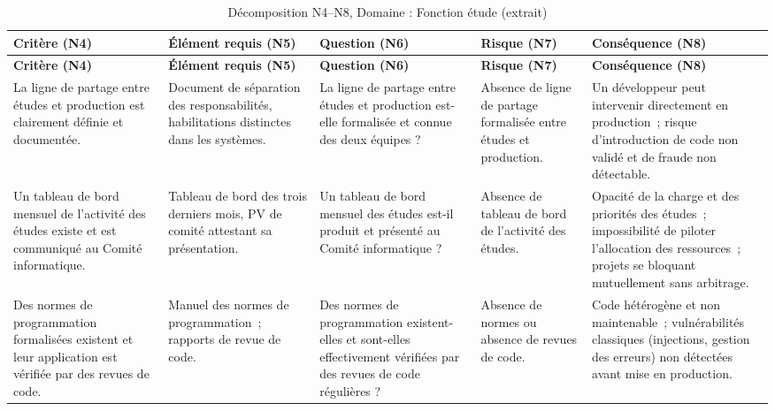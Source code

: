 \begin{longtable}{>{\raggedright\arraybackslash}p{3.2cm}
                  >{\raggedright\arraybackslash}p{3cm}
                  >{\raggedright\arraybackslash}p{2.8cm}
                  >{\raggedright\arraybackslash}p{2.6cm}
                  >{\raggedright\arraybackslash}p{2.8cm}}

\caption{Décomposition N4--N8, Domaine : Fonction étude (extrait)} \\

\toprule
\textbf{Critère (N4)} & \textbf{Élément requis (N5)} & \textbf{Question (N6)} & \textbf{Risque (N7)} & \textbf{Conséquence (N8)} \\
\midrule
\endfirsthead

\toprule
\textbf{Critère (N4)} & \textbf{Élément requis (N5)} & \textbf{Question (N6)} & \textbf{Risque (N7)} & \textbf{Conséquence (N8)} \\
\midrule
\endhead

\bottomrule
\endlastfoot

La ligne de partage entre études et production est clairement définie et documentée. &
Document de séparation des responsabilités, habilitations distinctes dans les systèmes. &
La ligne de partage entre études et production est-elle formalisée et connue des deux équipes ? &
Absence de ligne de partage formalisée entre études et production. &
Un développeur peut intervenir directement en production~; risque d'introduction de code non validé et de fraude non détectable. \\

\addlinespace

Un tableau de bord mensuel de l'activité des études existe et est communiqué au Comité informatique. &
Tableau de bord des trois derniers mois, PV de comité attestant sa présentation. &
Un tableau de bord mensuel des études est-il produit et présenté au Comité informatique ? &
Absence de tableau de bord de l'activité des études. &
Opacité de la charge et des priorités des études~; impossibilité de piloter l'allocation des ressources~; projets se bloquant mutuellement sans arbitrage. \\

\addlinespace

Des normes de programmation formalisées existent et leur application est vérifiée par des revues de code. &
Manuel des normes de programmation~; rapports de revue de code. &
Des normes de programmation existent-elles et sont-elles effectivement vérifiées par des revues de code régulières ? &
Absence de normes ou absence de revues de code. &
Code hétérogène et non maintenable~; vulnérabilités classiques (injections, gestion des erreurs) non détectées avant mise en production. \\


\end{longtable}
